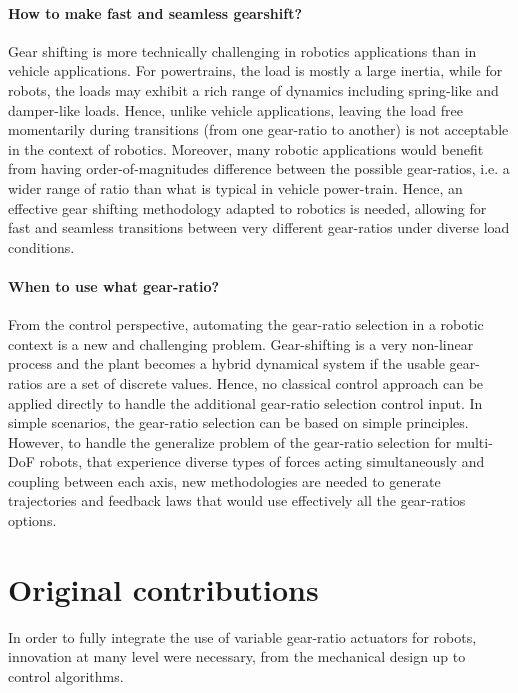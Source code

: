 \paragraph{How to make fast and seamless gearshift?}
Gear shifting is more technically challenging in robotics applications than in vehicle applications. For powertrains, the load is mostly a large inertia, while for robots, the loads may exhibit a rich range of dynamics including spring-like and damper-like loads. Hence, unlike vehicle applications, leaving the load free momentarily during transitions (from one gear-ratio to another) is not acceptable in the context of robotics. Moreover, many robotic applications would benefit from having order-of-magnitudes difference between the possible gear-ratios, i.e. a wider range of ratio than what is typical in vehicle power-train. Hence, an effective gear shifting methodology adapted to robotics is needed, allowing for fast and seamless transitions between very different gear-ratios under diverse load conditions.

\paragraph{When to use what gear-ratio?}
From the control perspective, automating the gear-ratio selection in a robotic context is a new and challenging problem. Gear-shifting is a very non-linear process and the plant becomes a hybrid dynamical system if the usable gear-ratios are a set of discrete values. Hence, no classical control approach can be applied directly to handle the additional gear-ratio selection control input. In simple scenarios, the gear-ratio selection can be based on simple principles. However, to handle the generalize problem of the gear-ratio selection for multi-DoF robots, that experience diverse types of forces acting simultaneously and coupling between each axis, new methodologies are needed to generate trajectories and feedback laws that would use effectively all the gear-ratios options.



\section{Original contributions}
\label{sec:contribution}

In order to fully integrate the use of variable gear-ratio actuators for robots, innovation at many level were necessary, from the mechanical design up to control algorithms. 

